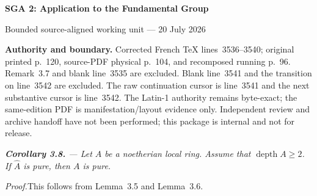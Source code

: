 \documentclass[10pt,a4paper]{article}
\newcommand{\depthop}{\operatorname{depth}}
\begin{document}
\begin{center}
  {\Large\bfseries SGA 2: Application to the Fundamental Group}\par\smallskip
  {\large Bounded source-aligned working unit --- 20 July 2026}
\end{center}

\noindent\colorbox{softgray}{\parbox{0.95\linewidth}{\footnotesize\textbf{Authority and boundary.}
Corrected French TeX lines~3536--3540; original printed p.~120,
source-PDF physical p.~104, and recomposed running p.~96. Remark~3.7 and
blank line~3535 are excluded. Blank line~3541 and the transition on
line~3542 are excluded. The raw continuation cursor is line~3541 and the
next substantive cursor is line~3542. The Latin-1 authority remains
byte-exact; the same-edition PDF is manifestation/layout evidence only.
Independent review and archive handoff have not been performed; this package
is internal and not for release.}}

\medskip
{\itshape
\noindent\textbf{Corollary 3.8.} --- Let $A$ be a noetherian local ring.
Assume that $\depthop A\geq 2$. If $\widehat{A}$ is pure, then $A$ is pure.
}

\medskip
\noindent\emph{Proof.}\quad This follows from Lemma~3.5 and Lemma~3.6.
\end{document}
